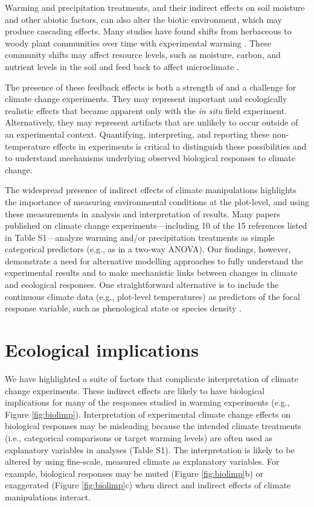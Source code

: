 \documentclass{article}
\begin{document}
\par Warming and precipitation treatments, and their indirect effects on soil moisture and other abiotic factors, can also alter the biotic environment, which may produce cascading effects. Many studies have found shifts from herbaceous to woody plant communities over time with experimental warming \citep[e.g.,][]{rollinson2012, mcdaniel2014,mcdaniel2014b, harte2015}. These community shifts may affect resource levels, such as moisture, carbon, and nutrient levels in the soil \citep{mcdaniel2014,mcdaniel2014b, harte2015} and feed back to affect microclimate \citep{harte2015}. 
\par The presence of these feedback effects is both a strength of and a challenge for climate change experiments. They may represent important and ecologically realistic effects that became apparent only with the \emph{in situ} field experiment. Alternatively, they may represent artifacts that are unlikely to occur outside of an experimental context. Quantifying, interpreting, and reporting these non-temperature effects in experiments is critical to distinguish these possibilities and to understand mechanisms underlying observed biological responses to climate change. 

\par The widespread presence of indirect effects of climate manipulations highlights the importance of measuring environmental conditions at the plot-level, and using these measurements in analysis and interpretation of results. Many papers published on climate change experiments---including 10 of the 15 references listed in Table S1---analyze warming and/or precipitation treatments as simple categorical predictors (e.g., as in a two-way ANOVA). Our findings, however, demonstrate a need for alternative modelling approaches to fully understand the experimental results and to make mechanistic links between changes in climate and ecological responses. One straightforward alternative is to include the continuous climate data (e.g., plot-level temperatures) as predictors of the focal response variable, such as phenological state or species density \citep [e.g.,][]{marchin2015, pelini2014}.
\section* {Ecological implications}

\par We have highlighted a suite of factors that complicate interpretation of climate change experiments. These indirect effects are likely to have biological implications for many of the responses studied in warming experiments (e.g., Figure \ref{fig:biolimp}). Interpretation of experimental climate change effects on biological responses may be misleading because the intended climate treatments (i.e., categorical comparisons or target warming levels) are often used as explanatory variables in analyses (Table S1). The interpretation is likely to be altered by using fine-scale, measured climate as explanatory variables. For example, biological responses may be muted (Figure \ref{fig:biolimp}b) or exaggerated (Figure \ref{fig:biolimp}c) when direct and indirect effects of climate manipulations interact.
\end{document}
